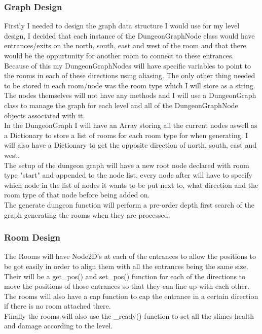 \documentclass{article}
\begin{document}
        \subsubsection{Graph Design}
        Firstly I needed to design the graph data structure I would use for my level design, I decided that each instance of the DungeonGraphNode class would have entrances/exits on the north, south, east and west of the room and that there would be the oppurtunity for another room to connect to these entrances. Because of this my DungeonGraphNodes will have specific variables to point to the rooms in each of these directions using aliasing. The only other thing needed to be stored in each room/node was the room type which I will store as a string.\\
        The nodes themselves will not have any methods and I will use a DungeonGraph class to manage the graph for each level and all of the DungeonGraphNode objects associated with it.\\
        In the DungeonGraph I will have an Array storing all the current nodes aswell as a Dictionary to store a list of rooms for each room type for when generating. I will also have a Dictionary to get the opposite direction of north, south, east and west.\\
        The setup of the dungeon graph will have a new root node declared with room type "start" and appended to the node list, every node after will have to specify which node in the list of nodes it wants to be put next to, what direction and the room type of that node before being added on.\\
        The generate dungeon function will perform a pre-order depth first search of the graph generating the rooms when they are processed.\\
        \subsubsection{Room Design}
        The Rooms will have Node2D's at each of the entrances to allow the positions to be got easily in order to align them with all the entrances being the same size. Their will be a get\_pos() and set\_pos() function for each of the directions to move the positions of those entrances so that they can line up with each other.\\
        The rooms will also have a cap function to cap the entrance in a certain direction if there is no room attached there.\\
        Finally the rooms will also use the \_ready() function to set all the slimes health and damage according to the level.\\
\end{document}
